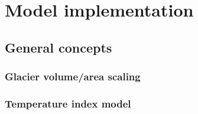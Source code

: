 \chapter{Model implementation}\label{chap:methods}
\thispagestyle{plain}

\section{General concepts} %
\label{sec:general_concepts}

    \subsection{Glacier volume/area scaling} %
    \label{sub:glacier_volume_area_scaling}



    

    \subsection{Temperature index model} %
    \label{sub:temperature_index_model}

